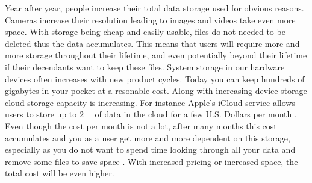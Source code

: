 

Year after year, people increase their total data storage used for obvious reasons. Cameras increase their resolution leading to images and videos take even more space. With storage being cheap and easily usable, files do not needed to be deleted thus the data accumulates. %
This means that users will require more and more storage throughout their lifetime, and even potentially beyond their lifetime if their decendants want to keep these files. System storage in our hardware devices often increases with new product cycles. Today you can keep hundreds of gigabytes in your pocket at a resonable cost.%
Along with increasing device storage cloud storage capacity is increasing. For instance Apple's iCloud service allows users to store up to \SI{2}{\tera\byte} of data in the cloud for a few U.S. Dollars per month %
. Even though the cost per month is not a lot, after many months this cost accumulates and you as a user get more and more dependent on this storage, especially as you do not want to spend time looking through all your data and remove some files to save space %
. With increased pricing or increased space, the total cost will be even higher.

